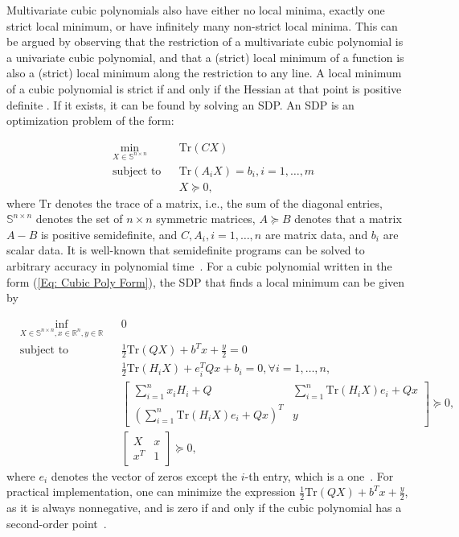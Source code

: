 \documentclass[11pt]{article}
\theoremstyle{plain}
\theoremstyle{definition}
\theoremstyle{remark}
\def \Snn{ \mathbb{S}^{n \times n}}
\def \bmat{\left[\begin{matrix}}
\def \emat{\end{matrix}\right]}
\def \Tr{\mathrm{Tr}}
\def \R{\mathbb{R}}
\def \Rn{\R^n}
\begin{document}
Multivariate cubic polynomials also have either no local minima, exactly one strict local minimum, or have infinitely many non-strict local minima. This can be argued by observing that the restriction of a multivariate cubic polynomial is a univariate cubic polynomial, and that a (strict) local minimum of a function is also a (strict) local minimum along the restriction to any line. A local minimum of a cubic polynomial is strict if and only if the Hessian at that point is positive definite \cite[Theorem 3.1, Corollary 3.4]{ahmadi2022complexity}. If it exists, it can be found by solving an SDP. An SDP is an optimization problem of the form:

\begin{equation*}
\begin{aligned}
& \underset{X \in \mathbb{S}^{n \times n}}{\min}
& & \Tr(CX) \\
& \text{subject to}
& & \Tr(A_iX) = b_i, i = 1, \ldots, m\\
&&& X \succeq 0,
\end{aligned}
\end{equation*}
where $\Tr$ denotes the trace of a matrix, i.e., the sum of the diagonal entries, $\mathbb{S}^{n \times n}$ denotes the set of $n \times n$ symmetric matrices, $A \succeq B$ denotes that a matrix $A - B$ is positive semidefinite, and $C, A_i, i = 1,\ldots, n$ are matrix data, and $b_i$ are scalar data. It is well-known that semidefinite programs can be solved to arbitrary accuracy in polynomial time~\cite{vandenberghe1996semidefinite}. For a cubic polynomial written in the form (\ref{Eq: Cubic Poly Form}), the SDP that finds a local minimum can be given by

\begin{equation}\label{Eq: complete cubic SDP}
    \begin{aligned}
	& \underset{X \in \Snn, x \in \Rn, y \in \R}{\inf}
	& & 0\\
	& \text{subject to}
    && \frac{1}{2}\Tr(QX) + b^Tx + \frac{y}{2} = 0\\
	&&&  \frac{1}{2}\Tr(H_iX)+e_i^TQx+b_i=0, \forall i = 1, \ldots, n,\\
	&&& \bmat \sum_{i=1}^n x_iH_i + Q & \sum_{i=1}^n \Tr(H_iX)e_i+Qx \\ (\sum_{i=1}^n \Tr(H_iX)e_i+Qx)^T & y\emat \succeq 0,\\
	&&& \bmat X & x \\ x^T & 1 \emat \succeq 0,
    \end{aligned}
\end{equation}
where $e_i$ denotes the vector of zeros except the $i$-th entry, which is a one~\cite[Algorithm~2]{ahmadi2022complexity}. For practical implementation, one can minimize the expression $\frac{1}{2}\Tr(QX) + b^Tx + \frac{y}{2}$, as it is always nonnegative, and is zero if and only if the cubic polynomial has a second-order point~\cite{ahmadi2022complexity}.
\end{document}
